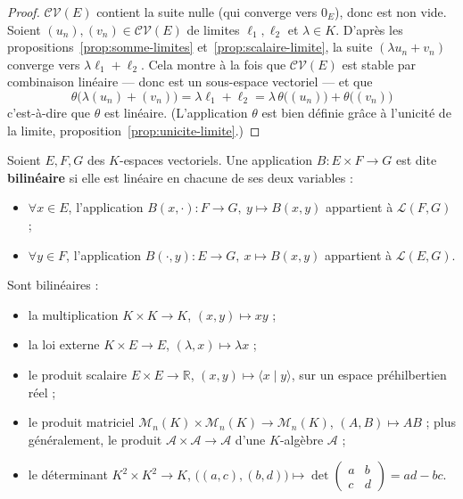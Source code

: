 \begin{proof}
$\mathcal{CV}(E)$ contient la suite nulle (qui converge vers $0_E$), donc est non vide. Soient $(u_n),(v_n)\in\mathcal{CV}(E)$ de limites $\ell_1,\ell_2$ et $\lambda\in K$. D'après les propositions~\ref{prop:somme-limites} et~\ref{prop:scalaire-limite}, la suite $(\lambda u_n+v_n)$ converge vers $\lambda\ell_1+\ell_2$. Cela montre à la fois que $\mathcal{CV}(E)$ est stable par combinaison linéaire — donc est un sous-espace vectoriel — et que
\[\theta\big(\lambda(u_n)+(v_n)\big) = \lambda\ell_1+\ell_2 = \lambda\,\theta\big((u_n)\big)+\theta\big((v_n)\big)\]
c'est-à-dire que $\theta$ est linéaire. (L'application $\theta$ est bien définie grâce à l'unicité de la limite, proposition~\ref{prop:unicite-limite}.)
\end{proof}

\begin{defi}
\label{defi:bilineaire}
Soient $E,F,G$ des $K$-espaces vectoriels. Une application $B:E\times F\to G$ est dite \textbf{bilinéaire} si elle est linéaire en chacune de ses deux variables :
\begin{itemize}
\item $\forall x\in E$, l'application $B(x,\cdot) : F\to G,\ y\mapsto B(x,y)$ appartient à $\mathcal{L}(F,G)$ ;
\item $\forall y\in F$, l'application $B(\cdot,y) : E\to G,\ x\mapsto B(x,y)$ appartient à $\mathcal{L}(E,G)$.
\end{itemize}
\end{defi}

\begin{exemple}
Sont bilinéaires :
\begin{itemize}
\item la multiplication $K\times K\to K$, $(x,y)\mapsto xy$ ;
\item la loi externe $K\times E\to E$, $(\lambda,x)\mapsto \lambda x$ ;
\item le produit scalaire $E\times E\to\mathbb{R}$, $(x,y)\mapsto\langle x\mid y\rangle$, sur un espace préhilbertien réel ;
\item le produit matriciel $\mathcal{M}_n(K)\times\mathcal{M}_n(K)\to\mathcal{M}_n(K)$, $(A,B)\mapsto AB$ ; plus généralement, le produit $\mathcal{A}\times\mathcal{A}\to\mathcal{A}$ d'une $K$-algèbre $\mathcal{A}$ ;
\item le déterminant $K^2\times K^2\to K$, $\big((a,c),(b,d)\big)\mapsto \det\begin{pmatrix} a & b \\ c & d\end{pmatrix}=ad-bc$.
\end{itemize}
\end{exemple}

